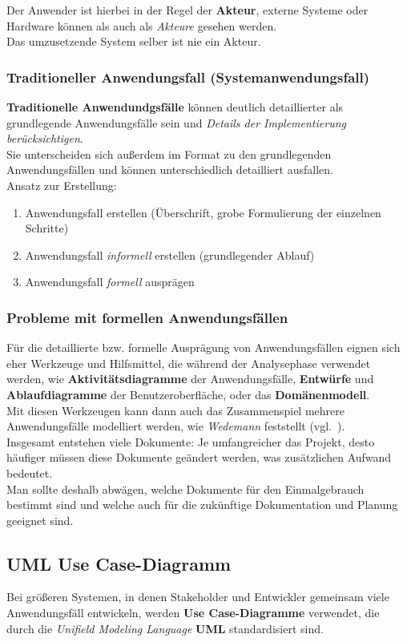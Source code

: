\noindent
Der Anwender ist hierbei in der Regel der \textbf{Akteur}, externe Systeme oder Hardware können als auch als \textit{Akteure} gesehen werden.\\
Das umzusetzende System selber ist nie ein Akteur.

\subsubsection*{Traditioneller Anwendungsfall (Systemanwendungsfall)}
\textbf{Traditionelle Anwendundgsfälle} können deutlich detaillierter als grundlegende Anwendungsfälle sein und \textit{Details der Implementierung berücksichtigen}.\\
Sie unterscheiden sich außerdem im Format zu den grundlegenden Anwendungsfällen und können unterschiedlich detailliert ausfallen.\\

\noindent
Ansatz zur Erstellung:

\begin{enumerate}
    \item Anwendungsfall  erstellen (Überschrift, grobe Formulierung der einzelnen Schritte)
    \item Anwendungsfall \textit{informell} erstellen (grundlegender Ablauf)
    \item Anwendungsfall \textit{formell} ausprägen
\end{enumerate}


\subsubsection*{Probleme mit formellen Anwendungsfällen}
Für die detaillierte bzw. formelle Ausprägung von Anwendungsfällen eignen sich eher Werkzeuge und Hilfsmittel, die während der Analysephase verwendet werden, wie \textbf{Aktivitätsdiagramme} der Anwendungsfälle, \textbf{Entwürfe} und \textbf{Ablaufdiagramme} der Benutzeroberfläche, oder das \textbf{Domänenmodell}.\\
Mit diesen Werkzeugen kann dann auch das Zusammenspiel mehrere Anwendungsfälle modelliert werden, wie \textit{Wedemann} feststellt (vgl.~\cite[71]{Wed09}).\\

\noindent
Insgesamt entstehen viele Dokumente: Je umfangreicher das Projekt, desto häufiger müssen diese Dokumente geändert werden, was zusätzlichen Aufwand bedeutet.\\
Man sollte deshalb abwägen, welche Dokumente für den Einmalgebrauch bestimmt sind und welche auch für die zukünftige Dokumentation und Planung geeignet sind.

\subsection*{UML Use Case-Diagramm}
Bei größeren Systemen, in denen Stakeholder und Entwickler gemeinsam viele Anwendungsfäll entwickeln, werden \textbf{Use Case-Diagramme} verwendet, die durch die \textit{Unifield Modeling Language} \textbf{UML} standardisiert sind.\\